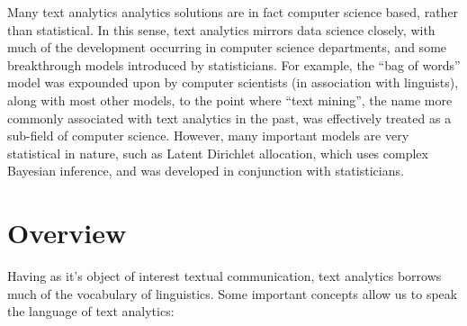 \documentclass[11pt, a4paper, titlepage]{report}
\begin{document}
Many text analytics analytics solutions are in fact computer science
based, rather than statistical. In this sense, text analytics mirrors
data science closely, with much of the development occurring in
computer science departments, and some breakthrough models introduced
by statisticians. For example, the ``bag of words'' model was expounded
upon by computer scientists (in association with linguists), along
with most other models, to the point where ``text mining'', the name
more commonly associated with text analytics in the past, was
effectively treated as a sub-field of computer
science\autocite{ko2012study}. However, many important models are very
statistical in nature, such as Latent Dirichlet allocation, which uses
complex Bayesian inference, and was developed in conjunction with
statisticians\autocite{blei2003latent}.

\section{Overview}\label{sec:overview}

Having as it's object of interest textual communication, text
analytics borrows much of the vocabulary of linguistics. Some
important concepts allow us to speak the language of text analytics:
\end{document}
